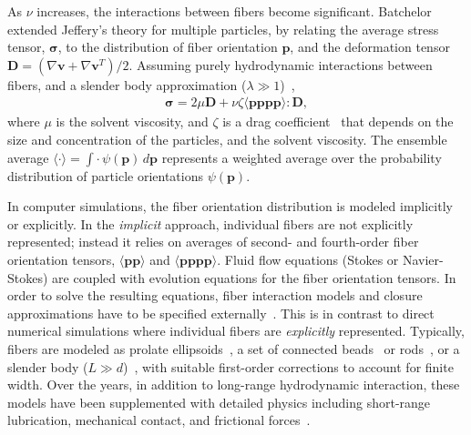 \documentclass[preprint, 10pt]{elsarticle}
\begin{document}
As $\nu$ increases, the interactions between fibers become significant.
Batchelor extended Jeffery's theory for multiple particles, by relating
the average stress tensor, ${\bm \sigma}$, to the distribution of fiber
orientation $\mathbf{p}$, and the deformation tensor $\mathbf{D} =
(\nabla \mathbf{v} + \nabla \mathbf{v}^T)/2$. Assuming purely
hydrodynamic interactions between fibers, and a slender body
approximation ($\lambda \gg 1$)~\cite{Batchelor1970, Batchelor1970a,
Doi1978, Dinh1984, Shaqfeh1990},
\begin{align}
  {\bm \sigma} = 2 \mu \mathbf{D} + \nu \zeta 
    \langle \mathbf{p p p p} \rangle : \mathbf{D},
\label{eqn:batchelor}
\end{align}
where $\mu$ is the solvent viscosity, and $\zeta$ is a drag
coefficient~\cite{Batchelor1971} that depends on the size and
concentration of the particles, and the solvent viscosity. The ensemble
average $\langle \cdot \rangle = \int \cdot \,
\psi(\mathbf{p})\,d\mathbf{p}$ represents a weighted average over the
probability distribution of particle orientations $\psi(\mathbf{p})$. 

In computer simulations, the fiber orientation distribution is modeled
implicitly or explicitly. In the \emph{implicit} approach, individual
fibers are not explicitly represented; instead it relies on averages of
second- and fourth-order fiber orientation tensors, $\langle \mathbf{p
p} \rangle$ and $\langle \mathbf{p p p p} \rangle$. Fluid flow equations
(Stokes or Navier-Stokes) are coupled with evolution equations for the
fiber orientation tensors. In order to solve the resulting equations,
fiber interaction models and closure approximations have to be specified
externally~\cite{Advani1987, Advani1990, Ferec2014, Perez2017}. This is
in contrast to direct numerical simulations where individual fibers are
\emph{explicitly} represented. Typically, fibers are modeled as
prolate ellipsoids~\cite{Ausias2006}, a set of connected
beads~\cite{Yamamoto1996, Joung2001} or rods~\cite{Schmid2000,
Lindstroem2007}, or a slender body ($L \gg d$)~\cite{Fan1998,
Rahnama1995, tor-she2004, tor-gus2006, gus-tor2009}, with suitable
first-order corrections to account for finite width. Over the years, in
addition to long-range hydrodynamic interaction, these models have been
supplemented with detailed physics including short-range lubrication,
mechanical contact, and frictional forces~\cite{Sundararajakumar1997,
Lindstroem2008}.
\end{document}
